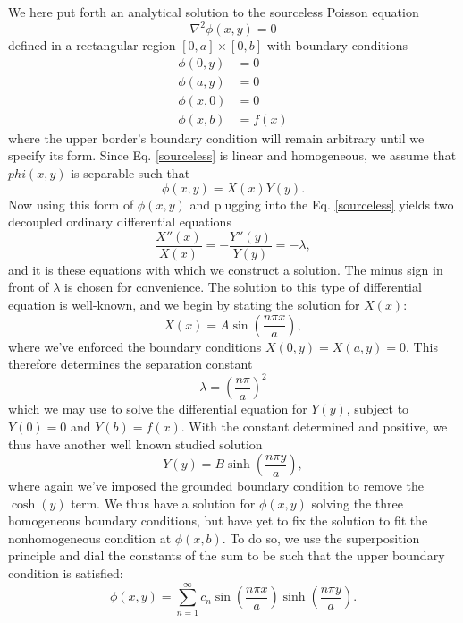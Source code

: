 \documentclass[reprint, amsmath, amssymb, aps, floatfix]{revtex4-1}
\begin{document}
We here put forth an analytical solution to the sourceless Poisson equation \begin{equation}
\nabla^2\phi(x,y)=0 \label{sourceless}
\end{equation} defined in a rectangular region $[0, a]\times [0, b]$ with boundary conditions
\begin{equation}
\begin{aligned}
\phi(0, y) &= 0 \\
\phi(a, y) &= 0\\
\phi(x, 0) &= 0\\
\phi(x, b) &= f(x) \label{bcs}
\end{aligned}
\end{equation} where the upper border's boundary condition will remain arbitrary until we specify its form. Since Eq. \ref{sourceless} is linear and homogeneous, we assume that $phi(x,y)$ is separable such that \begin{equation} \phi(x,y)=X(x)Y(y). \label{separable} \end{equation} Now using this form of $\phi(x,y)$ and plugging into the Eq. \ref{sourceless} yields two decoupled ordinary differential equations \begin{equation}
\frac{X''(x)}{X(x)} = -\frac{Y''(y)}{Y(y)} = - \lambda, \label{separated}
\end{equation} and it is these equations with which we construct a solution. The minus sign in front of $\lambda$ is chosen for convenience. The solution to this type of differential equation is well-known, and we begin by stating the solution for $X(x)$: \begin{equation}
X(x) = A\sin\left(\frac{n\pi x}{a}\right), \label{xeq}
\end{equation} where we've enforced the boundary conditions $X(0, y)=X(a, y)=0$. This therefore determines the separation constant \begin{equation}
\lambda = \left(\frac{n\pi}{a}\right)^2 \label{lambda}
\end{equation} which we may use to solve the differential equation for $Y(y)$, subject to $Y(0)=0$ and $Y(b)=f(x)$. With the constant determined and positive, we thus have another well known studied solution \begin{equation}
Y(y) = B\sinh\left(\frac{n\pi y}{a}\right), \label{yeq}
\end{equation} where again we've imposed the grounded boundary condition to remove the $\cosh(y)$ term. We thus have a solution for $\phi(x,y)$ solving the three homogeneous boundary conditions, but have yet to fix the solution to fit the nonhomogeneous condition at $\phi(x,b)$. To do so, we use the superposition principle and dial the constants of the sum to be such that the upper boundary condition is satisfied: \begin{equation}
\phi(x,y)=\sum_{n=1}^\infty c_n \sin\left(\frac{n\pi x}{a}\right)\sinh\left(\frac{n\pi y}{a}\right) \label{phisum}.
\end{equation}
\end{document}
